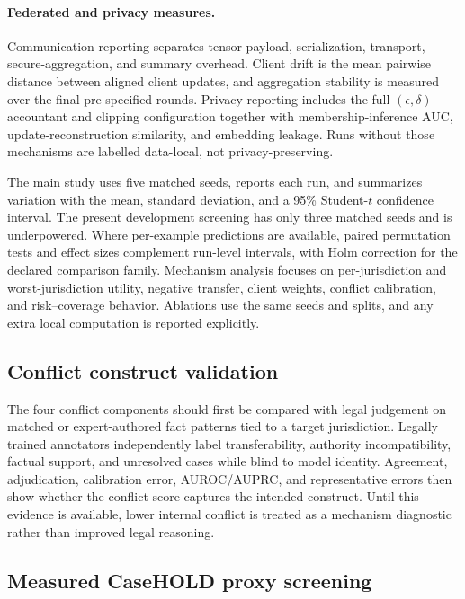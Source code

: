 \documentclass[preprint,12pt,authoryear]{elsarticle}
\begin{document}
\paragraph{Federated and privacy measures.}
Communication reporting separates tensor payload, serialization, transport, secure-aggregation, and summary overhead. Client drift is the mean pairwise distance between aligned client updates, and aggregation stability is measured over the final pre-specified rounds. Privacy reporting includes the full $(\epsilon,\delta)$ accountant and clipping configuration together with membership-inference AUC, update-reconstruction similarity, and embedding leakage. Runs without those mechanisms are labelled data-local, not privacy-preserving.

The main study uses five matched seeds, reports each run, and summarizes variation with the mean, standard deviation, and a 95\% Student-$t$ confidence interval. The present development screening has only three matched seeds and is underpowered. Where per-example predictions are available, paired permutation tests and effect sizes complement run-level intervals, with Holm correction for the declared comparison family. Mechanism analysis focuses on per-jurisdiction and worst-jurisdiction utility, negative transfer, client weights, conflict calibration, and risk--coverage behavior. Ablations use the same seeds and splits, and any extra local computation is reported explicitly.

\subsection{Conflict construct validation}

The four conflict components should first be compared with legal judgement on matched or expert-authored fact patterns tied to a target jurisdiction. Legally trained annotators independently label transferability, authority incompatibility, factual support, and unresolved cases while blind to model identity. Agreement, adjudication, calibration error, AUROC/AUPRC, and representative errors then show whether the conflict score captures the intended construct. Until this evidence is available, lower internal conflict is treated as a mechanism diagnostic rather than improved legal reasoning.

\subsection{Measured CaseHOLD proxy screening}
\end{document}
